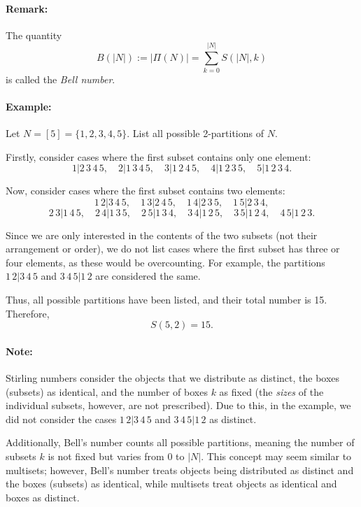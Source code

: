 \documentclass[docmute]{article}
\begin{document}
\paragraph{Remark:}  
The quantity  
\[
B(|N|) := |\Pi(N)| = \sum_{k=0}^{|N|} S(|N|, k)
\]  
is called the \emph{Bell number}.
\paragraph{Example:}  
Let \( N = [5] = \{1,2,3,4,5\} \). List all possible 2-partitions of \( N \).  

Firstly, consider cases where the first subset contains only one element:  
\[
1 | 2\,3\,4\,5, \quad 2 | 1\,3\,4\,5, \quad 3 | 1\,2\,4\,5, \quad 4 | 1\,2\,3\,5, \quad 5 | 1\,2\,3\,4.
\]  

Now, consider cases where the first subset contains two elements:  
\[
1\,2 | 3\,4\,5, \quad 1\,3 | 2\,4\,5, \quad 1\,4 | 2\,3\,5, \quad 1\,5 | 2\,3\,4,
\]
\[
2\,3 | 1\,4\,5, \quad 2\,4 | 1\,3\,5, \quad 2\,5 | 1\,3\,4, \quad 3\,4 | 1\,2\,5, \quad 3\,5 | 1\,2\,4, \quad 4\,5 | 1\,2\,3.
\]  

Since we are only interested in the contents of the two subsets (not their arrangement or order), we do not list cases where the first subset has three or four elements, as these would be overcounting.  
For example, the partitions \( 1\,2 | 3\,4\,5 \) and \( 3\,4\,5 | 1\,2 \) are considered the same.  

Thus, all possible partitions have been listed, and their total number is 15. Therefore,  
\[
S(5,2) = 15.
\]

\paragraph{Note:}  
Stirling numbers consider the objects that we distribute as distinct, the boxes (subsets) as identical, and the number of boxes \( k \) as fixed (the \emph{sizes} of the individual subsets, however, are not prescribed). Due to this, in the example, we did not consider the cases \( 1\,2 | 3\,4\,5 \) and \( 3\,4\,5 | 1\,2 \) as distinct.

Additionally, Bell's number counts all possible partitions, meaning the number of subsets \( k \) is not fixed but varies from \( 0 \) to \( |N| \). This concept may seem similar to multisets; however, Bell's number treats objects being distributed as distinct and the boxes (subsets) as identical, while multisets treat objects as identical and boxes as distinct.
\end{document}
